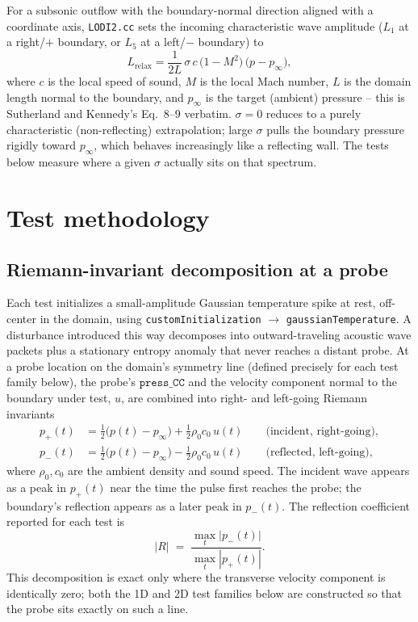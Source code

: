 \documentclass[11pt]{article}
\begin{document}
For a subsonic outflow with the boundary-normal direction aligned with a
coordinate axis, \texttt{LODI2.cc} sets the incoming characteristic wave
amplitude ($L_1$ at a right/$+$ boundary, or $L_5$ at a left/$-$ boundary) to
\begin{equation}
  L_{\text{relax}} = \frac{1}{2L}\,\sigma\, c\,\bigl(1 - M^2\bigr)\,
                      \bigl(p - p_\infty\bigr),
  \label{eq:relax}
\end{equation}
where $c$ is the local speed of sound, $M$ is the local Mach number, $L$ is
the domain length normal to the boundary, and $p_\infty$ is the target
(ambient) pressure -- this is Sutherland and Kennedy's Eq.\ 8--9 verbatim.
$\sigma=0$ reduces to a purely characteristic (non-reflecting) extrapolation;
large $\sigma$ pulls the boundary pressure rigidly toward $p_\infty$, which
behaves increasingly like a reflecting wall. The tests below measure where a
given $\sigma$ actually sits on that spectrum.

\section{Test methodology}
\label{sec:methodology}

\subsection{Riemann-invariant decomposition at a probe}

Each test initializes a small-amplitude Gaussian temperature spike at rest,
off-center in the domain, using \texttt{customInitialization}
$\rightarrow$ \texttt{gaussianTemperature}. A disturbance introduced this way
decomposes into outward-traveling acoustic wave packets plus a stationary
entropy anomaly that never reaches a distant probe. At a probe location
on the domain's symmetry line (defined precisely for each test family
below), the probe's $\texttt{press\_CC}$ and the velocity component normal
to the boundary under test, $u$, are combined into right- and left-going
Riemann invariants
\begin{align}
  p_{+}(t) &= \tfrac{1}{2}\bigl(p(t)-p_\infty\bigr) + \tfrac{1}{2}\rho_0 c_0\, u(t)
              \qquad \text{(incident, right-going)}, \\
  p_{-}(t) &= \tfrac{1}{2}\bigl(p(t)-p_\infty\bigr) - \tfrac{1}{2}\rho_0 c_0\, u(t)
              \qquad \text{(reflected, left-going)},
  \label{eq:riemann}
\end{align}
where $\rho_0,c_0$ are the ambient density and sound speed. The incident wave
appears as a peak in $p_+(t)$ near the time the pulse first reaches the
probe; the boundary's reflection appears as a later peak in $p_-(t)$. The
reflection coefficient reported for each test is
\begin{equation}
  |R| \;=\; \frac{\max_t |p_-(t)|}{\max_t |p_+(t)|} .
  \label{eq:Rdef}
\end{equation}
This decomposition is exact only where the transverse velocity component is
identically zero; both the 1D and 2D test families below are constructed so
that the probe sits exactly on such a line.
\end{document}
